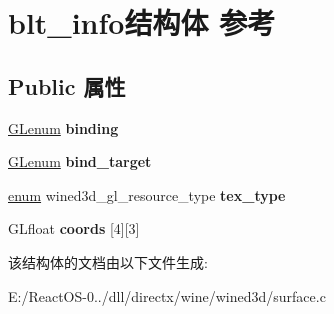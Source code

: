 \hypertarget{structblt__info}{}\section{blt\+\_\+info结构体 参考}
\label{structblt__info}
\subsection*{Public 属性}
\begin{DoxyCompactItemize}
\item 
\mbox{\label{structblt__info_ad0e8bdc987287302609f4bdb937c3efd}} 
\hyperlink{interfacevoid}{G\+Lenum} {\bfseries binding}
\item 
\mbox{\label{structblt__info_a5fd51380fabe58baf7a8306f3665c414}} 
\hyperlink{interfacevoid}{G\+Lenum} {\bfseries bind\+\_\+target}
\item 
\mbox{\label{structblt__info_a42c2401d56220fecb46be5468c2eee4a}} 
\hyperlink{interfaceenum}{enum} wined3d\+\_\+gl\+\_\+resource\+\_\+type {\bfseries tex\+\_\+type}
\item 
\mbox{\label{structblt__info_a4194ace3ba3dad0b2b073722947aba68}} 
G\+Lfloat {\bfseries coords} \mbox{[}4\mbox{]}\mbox{[}3\mbox{]}
\end{DoxyCompactItemize}


该结构体的文档由以下文件生成\+:\begin{DoxyCompactItemize}
\item 
E\+:/\+React\+O\+S-\/0../dll/directx/wine/wined3d/surface.\+c\end{DoxyCompactItemize}
